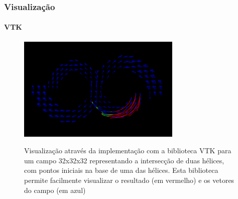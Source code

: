 \documentclass[brazil, 10pt]{beamer}
\begin{document}
\begin{frame}
  \frametitle{Visualização}
  \framesubtitle{VTK}
  \begin{figure}
    \begin{center}
      \includegraphics[width=78mm, height=50mm]{img/vtk.png}
      \label{fig:}
      \caption{Visualização através da implementação com a biblioteca VTK para um campo 32x32x32 representando a intersecção de duas hélices, com pontos iniciais na base de uma das hélices. Esta biblioteca permite facilmente visualizar o resultado (em vermelho) e os vetores do campo (em azul)}
    \end{center}
  \end{figure}
    
\end{frame}
\end{document}
